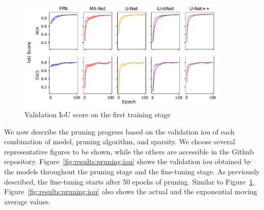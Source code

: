 \documentclass[mathematics,article,submit,pdftex,moreauthors]{Definitions/mdpi}
\begin{document}
\begin{figure}[htbp]
    \begin{center}
    \includegraphics[width=0.9\textwidth]{figures/iou_training_progress.pdf}
    \caption{Validation IoU score on the first training stage}
    \label{fig:results:training:iou}
    \end{center}
\end{figure}

We now describe the pruning
progress based on the validation \ac{iou} of
each combination of model, pruning algorithm,
and sparsity. We choose several representative
figures to be shown, while 
the others are accessible in the Github repository.
Figure~\ref{fig:results:pruning:iou} shows the validation
\ac{iou} obtained by the models throughout the pruning
stage and the fine-tuning stage. As previously described,
the fine-tuning starts after 50 epochs of pruning. 
Similar to Figure~\ref{fig:results:training:iou},
Figure~\ref{fig:results:pruning:iou} also shows
the actual and the exponential moving average values.
\end{document}
